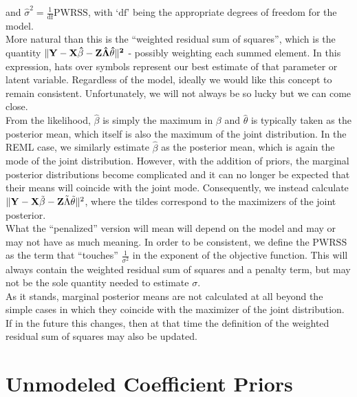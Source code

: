 \documentclass[10pt]{article}
\begin{document}
\noindent and  $\hat\sigma^2 = \frac{1}{\mathrm{df}}\mathrm{PWRSS}$,
with `$\mathrm{df}$' being the appropriate degrees of freedom for the
model. \\

More natural than this is the ``weighted residual sum of
squares'', which is the quantity $\|{\bf Y} -
\bf{X}\hat\beta - {\bf Z}\hat\Lambda\hat\theta\|^2$ - possibly
weighting each summed element. In this expression, hats over symbols represent our
best estimate of that parameter or latent variable. Regardless of the
model, ideally we would like
this concept to remain consistent. Unfortunately, we will not always be so
lucky but we can come close. \\

From the likelihood, $\hat\beta$ is
simply the maximum in $\beta$ and $\hat\theta$ is typically taken as the
posterior mean, which itself is also the maximum of the joint
distribution. In the REML case, we similarly estimate $\hat\beta$
as the posterior mean, which is again the mode of the joint
distribution. However, with the addition of priors, the marginal
posterior distributions become complicated and it can no longer be expected
that their means will coincide with the joint mode. Consequently, we
instead calculate $\|{\bf Y} - {\bf X}\tilde\beta - {\bf
Z}\tilde\Lambda\tilde\theta\|^2$, where the tildes correspond to the
maximizers of the joint posterior. \\

What the ``penalized'' version will mean will depend on the model and
may or may not have as much meaning. In order to be consistent, we
define the $\mathrm{PWRSS}$ as the term that ``touches''
$\frac{1}{\sigma^2}$ in the exponent of the objective function. This
will always contain the weighted residual sum of squares and a penalty
term, but may not be the sole quantity needed to estimate
$\sigma$. \\

As it stands, marginal posterior means are not calculated at all
beyond the simple cases in which they coincide with the maximizer of
the joint distribution. If in the future this changes, then at that
time the definition of the weighted residual sum of squares may also be updated.

\newpage

\section*{Unmodeled Coefficient Priors}
\end{document}
